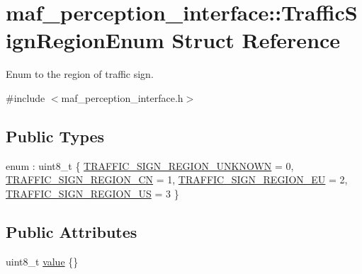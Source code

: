 \hypertarget{structmaf__perception__interface_1_1TrafficSignRegionEnum}{}\section{maf\+\_\+perception\+\_\+interface\+:\+:Traffic\+Sign\+Region\+Enum Struct Reference}
\label{structmaf__perception__interface_1_1TrafficSignRegionEnum}


Enum to the region of traffic sign.  




{\ttfamily \#include $<$maf\+\_\+perception\+\_\+interface.\+h$>$}

\subsection*{Public Types}
\begin{DoxyCompactItemize}
\item 
enum \+: uint8\+\_\+t \{ \hyperlink{structmaf__perception__interface_1_1TrafficSignRegionEnum_af409622a5776cb532f3500c8f91d8b4dad526c65891be18af8c5ff6de48e952e7}{T\+R\+A\+F\+F\+I\+C\+\_\+\+S\+I\+G\+N\+\_\+\+R\+E\+G\+I\+O\+N\+\_\+\+U\+N\+K\+N\+O\+WN} = 0, 
\hyperlink{structmaf__perception__interface_1_1TrafficSignRegionEnum_af409622a5776cb532f3500c8f91d8b4da24f71463eccb615d18f164995c3d2865}{T\+R\+A\+F\+F\+I\+C\+\_\+\+S\+I\+G\+N\+\_\+\+R\+E\+G\+I\+O\+N\+\_\+\+CN} = 1, 
\hyperlink{structmaf__perception__interface_1_1TrafficSignRegionEnum_af409622a5776cb532f3500c8f91d8b4dad4a31363d9fd358fac5bd768bc545b37}{T\+R\+A\+F\+F\+I\+C\+\_\+\+S\+I\+G\+N\+\_\+\+R\+E\+G\+I\+O\+N\+\_\+\+EU} = 2, 
\hyperlink{structmaf__perception__interface_1_1TrafficSignRegionEnum_af409622a5776cb532f3500c8f91d8b4dac40f0815652b887cb204d4b7b6a938af}{T\+R\+A\+F\+F\+I\+C\+\_\+\+S\+I\+G\+N\+\_\+\+R\+E\+G\+I\+O\+N\+\_\+\+US} = 3
 \}
\end{DoxyCompactItemize}
\subsection*{Public Attributes}
\begin{DoxyCompactItemize}
\item 
uint8\+\_\+t \hyperlink{structmaf__perception__interface_1_1TrafficSignRegionEnum_a42b0b208c0f456547f43262aa2fc0510}{value} \{\}
\end{DoxyCompactItemize}


